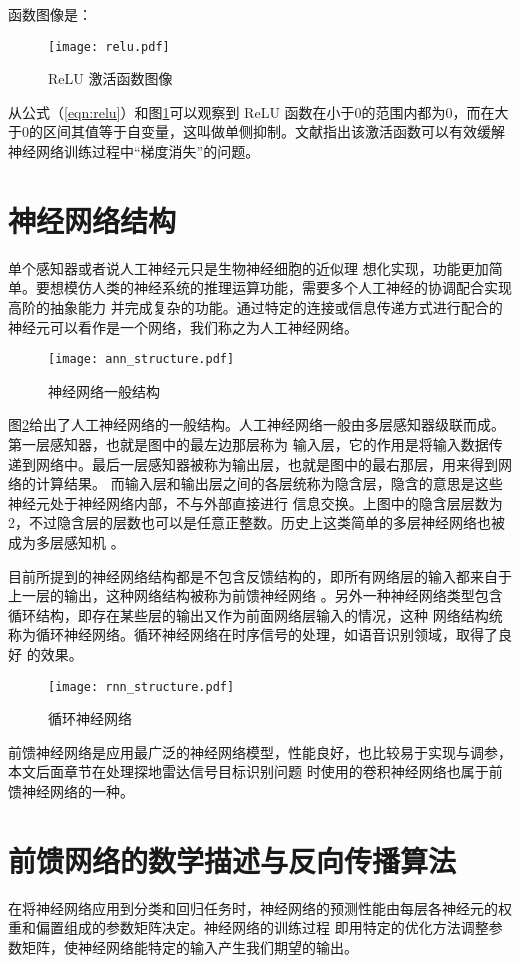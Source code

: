 函数图像是：
\begin{figure}[htbp]
	\texttt{[image: relu.pdf]}
	\caption{ReLU 激活函数图像}
	\label{relu}
\end{figure}

从公式（\ref{eqn:relu}）和图\ref{relu}可以观察到 ReLU 函数在小于0的范围内都为0，而在大于0的区间其值等于自变量，这叫做单侧抑制。文献\cite{glorot2011deep}指出该激活函数可以有效缓解
神经网络训练过程中“梯度消失”的问题。

\section{神经网络结构}
单个感知器或者说人工神经元只是生物神经细胞的近似理
想化实现，功能更加简单。要想模仿人类的神经系统的推理运算功能，需要多个人工神经的协调配合实现高阶的抽象能力
并完成复杂的功能。通过特定的连接或信息传递方式进行配合的神经元可以看作是一个网络，我们称之为人工神经网络。

\begin{figure}[htbp]
	\texttt{[image: ann\_structure.pdf]}
	\caption{神经网络一般结构}
	\label{ann_structure}
\end{figure}

图\ref{ann_structure}给出了人工神经网络的一般结构。人工神经网络一般由多层感知器级联而成。第一层感知器，也就是图中的最左边那层称为
输入层，它的作用是将输入数据传递到网络中。最后一层感知器被称为输出层，也就是图中的最右那层，用来得到网络的计算结果。
而输入层和输出层之间的各层统称为隐含层，隐含的意思是这些神经元处于神经网络内部，不与外部直接进行
信息交换。上图中的隐含层层数为 2，不过隐含层的层数也可以是任意正整数。历史上这类简单的多层神经网络也被成为多层感知机
。

目前所提到的神经网络结构都是不包含反馈结构的，即所有网络层的输入都来自于上一层的输出，这种网络结构被称为前馈神经网络
。另外一种神经网络类型包含循环结构，即存在某些层的输出又作为前面网络层输入的情况，这种
网络结构统称为循环神经网络。循环神经网络在时序信号的处理，如语音识别领域，取得了良好
的效果。

\begin{figure}[htbp]
	\texttt{[image: rnn\_structure.pdf]}
	\caption{循环神经网络}
	\label{rnn_structure}
\end{figure}

前馈神经网络是应用最广泛的神经网络模型，性能良好，也比较易于实现与调参，本文后面章节在处理探地雷达信号目标识别问题
时使用的卷积神经网络也属于前馈神经网络的一种。

\section{前馈网络的数学描述与反向传播算法}
在将神经网络应用到分类和回归任务时，神经网络的预测性能由每层各神经元的权重和偏置组成的参数矩阵决定。神经网络的训练过程
即用特定的优化方法调整参数矩阵，使神经网络能特定的输入产生我们期望的输出。

